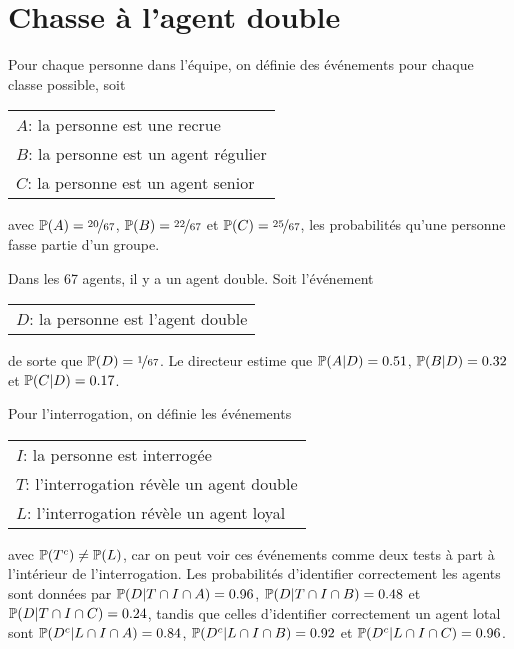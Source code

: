 \documentclass[11pt]{article}
\renewcommand\P{%
    \ensuremath{%
        \mathbb{P}%
    }%
}
\begin{document}
\section{Chasse à l'agent double}
Pour chaque personne dans l'équipe, on définie des événements pour chaque
classe possible, soit
\begin{table}[H]
    \centering
    \begin{tabular}{l}
        $A$: la personne est une recrue\\
        $B$: la personne est un agent régulier\\
        $C$: la personne est un agent senior\\
    \end{tabular}
\end{table}\noindent
avec
$\P(A)=\nicefrac{20}{67}$,
$\P(B)=\nicefrac{22}{67}$ et
$\P(C)=\nicefrac{25}{67}$,
les probabilités qu'une personne fasse partie d'un groupe.

Dans les 67 agents, il y a un agent double. Soit l'événement
\begin{table}[H]
    \centering
    \begin{tabular}{l}
        $D$: la personne est l'agent double\\
    \end{tabular}
\end{table}\noindent
de sorte que $\P(D)=\nicefrac{1}{67}$. Le directeur estime que
$\P(A|D)=0.51$,
$\P(B|D)=0.32$ et
$\P(C|D)=0.17$.

Pour l'interrogation, on définie les événements
\begin{table}[H]
    \centering
    \begin{tabular}{l}
        $I$: la personne est interrogée\\
        $T$: l'interrogation révèle un agent double\\
        $L$: l'interrogation révèle un agent loyal\\
    \end{tabular}
\end{table}\noindent
avec $\P(T^c)\neq\P(L)$, car on peut voir ces événements comme deux
tests à part à l'intérieur de l'interrogation. Les probabilités
d'identifier correctement les agents sont données par
$\P(D|T\cap I\cap A)=0.96$,
$\P(D|T\cap I\cap B)=0.48$ et
$\P(D|T\cap I\cap C)=0.24$,
tandis que celles d'identifier correctement un agent lotal sont
$\P(D^c|L\cap I\cap A)=0.84$,
$\P(D^c|L\cap I\cap B)=0.92$ et
$\P(D^c|L\cap I\cap C)=0.96$.
\end{document}
